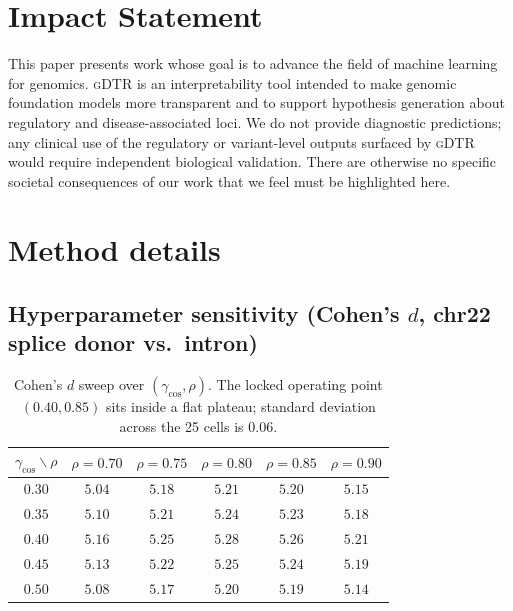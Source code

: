 \documentclass[12pt]{article}
\theoremstyle{plain}
\theoremstyle{definition}
\theoremstyle{remark}
\newcommand{\gDTR}{\textsc{gDTR}}
\begin{document}
\section*{Impact Statement}
This paper presents work whose goal is to advance the field of
machine learning for genomics. \gDTR{} is an interpretability tool
intended to make genomic foundation models more transparent and to
support hypothesis generation about regulatory and disease-associated
loci. We do not provide diagnostic predictions; any clinical use of
the regulatory or variant-level outputs surfaced by \gDTR{} would
require independent biological validation. There are otherwise no
specific societal consequences of our work that we feel must be
highlighted here.



\newpage
\appendix
\onecolumn

\section{Method details}
\label{app:method}

\subsection{Hyperparameter sensitivity (Cohen's $d$, chr22 splice donor vs.\ intron)}
\label{app:gamma-sweep}

\begin{table}[h]
\caption{Cohen's $d$ sweep over $(\gamma_{\cos}, \rho)$. The locked
operating point $(0.40, 0.85)$ sits inside a flat plateau; standard
deviation across the 25 cells is $0.06$.}
\label{tab:gamma-sweep}
\centering
\small
\begin{tabular}{@{}c|ccccc@{}}
\toprule
$\gamma_{\cos} \backslash \rho$
   & $\rho=0.70$ & $\rho=0.75$ & $\rho=0.80$ & $\rho=0.85$ & $\rho=0.90$ \\
\midrule
$0.30$ & $5.04$ & $5.18$ & $5.21$ & $5.20$ & $5.15$ \\
$0.35$ & $5.10$ & $5.21$ & $5.24$ & $5.23$ & $5.18$ \\
$0.40$ & $5.16$ & $5.25$ & $\mathbf{5.28}$ & $\mathbf{5.26}$ & $5.21$ \\
$0.45$ & $5.13$ & $5.22$ & $5.25$ & $5.24$ & $5.19$ \\
$0.50$ & $5.08$ & $5.17$ & $5.20$ & $5.19$ & $5.14$ \\
\bottomrule
\end{tabular}
\end{table}
\end{document}
